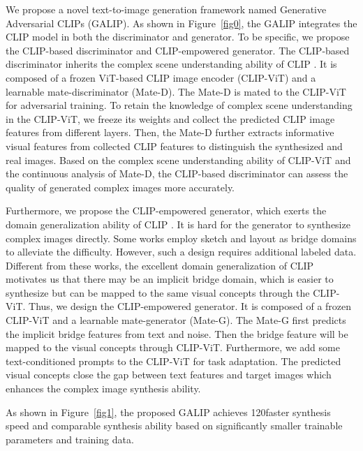 \documentclass[10pt,twocolumn,letterpaper]{article}
\begin{document}
We propose a novel text-to-image generation framework named Generative Adversarial CLIPs (GALIP).
As shown in Figure~\ref{fig0}, the GALIP integrates the CLIP model \cite{radford2021learning} in both the discriminator and generator.
To be specific, we propose the CLIP-based discriminator and CLIP-empowered generator.
The CLIP-based discriminator inherits the complex scene understanding ability of CLIP \cite{radford2021learning}.
It is composed of a frozen ViT-based CLIP image encoder (CLIP-ViT) and a learnable mate-discriminator (Mate-D).
The Mate-D is mated to the CLIP-ViT for adversarial training.
To retain the knowledge of complex scene understanding in the CLIP-ViT, we freeze its weights and collect the predicted CLIP image features from different layers.
Then, the Mate-D further extracts informative visual features from collected CLIP features to distinguish the synthesized and real images.
Based on the complex scene understanding ability of CLIP-ViT and the continuous analysis of Mate-D, the CLIP-based discriminator can assess the quality of generated complex images more accurately.

Furthermore, we propose the CLIP-empowered generator, which exerts the domain generalization ability of CLIP \cite{radford2021learning}.
It is hard for the generator to synthesize complex images directly.
Some works employ sketch \cite{gafni2022make} and layout \cite{li2019object,liang2022layout} as bridge domains to alleviate the difficulty.
However, such a design requires additional labeled data.
Different from these works, the excellent domain generalization of CLIP \cite{radford2021learning} motivates us that there may be an implicit bridge domain, which is easier to synthesize but can be mapped to the same visual concepts through the CLIP-ViT.
Thus, we design the CLIP-empowered generator.
It is composed of a frozen CLIP-ViT and a learnable mate-generator (Mate-G).
The Mate-G first predicts the implicit bridge features from text and noise.
Then the bridge feature will be mapped to the visual concepts through CLIP-ViT.
Furthermore, we add some text-conditioned prompts to the CLIP-ViT for task adaptation.
The predicted visual concepts close the gap between text features and target images which enhances the complex image synthesis ability.

As shown in Figure~\ref{fig1}, the proposed GALIP achieves 120faster synthesis speed and comparable synthesis ability based on significantly smaller trainable parameters and training data.
\end{document}
